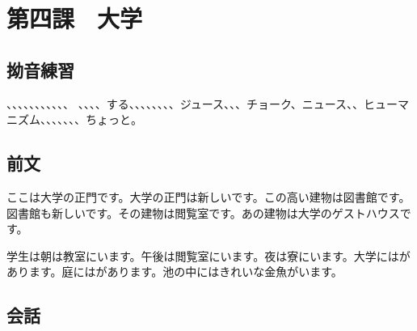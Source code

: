 \documentclass[a5j]{ltjtarticle}
\begin{document}
\section*{第四課　大学}

\subsection*{拗音練習}

\begin{onehalfspace}
  、、、、、、、、、、、
  、、、、する、、、、、、、、ジュース、、、チョーク、ニュース、、ヒューマニズム、、、、、、、ちょっと。
\end{onehalfspace}

\subsection*{前文}

ここは大学の正門です。大学の正門は新しいです。この高い建物は図書館です。図書館も新しいです。その建物は閲覧室です。あの建物は大学のゲストハウスです。

学生は朝は教室にいます。午後は閲覧室にいます。夜は寮にいます。大学にはがあります。庭にはがあります。池の中にはきれいな金魚がいます。

\subsection*{会話}
\end{document}
